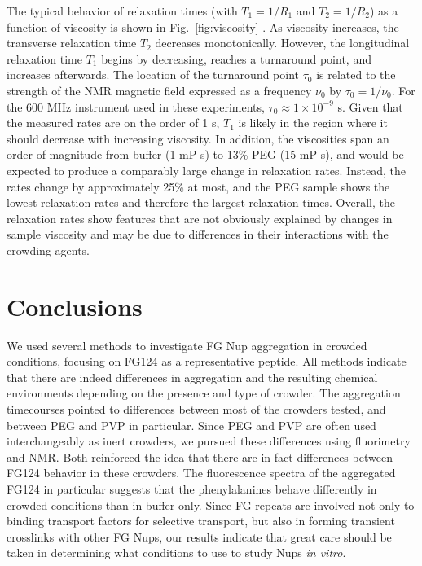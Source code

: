 The typical behavior of relaxation times (with $T_1 = 1/R_1$ and $T_2 = 1/R_2$) as a function of viscosity is shown in Fig.~\ref{fig:viscosity} \cite{reich18}.  As viscosity increases, the transverse relaxation time $T_2$ decreases monotonically.  However, the longitudinal relaxation time $T_1$ begins by decreasing, reaches a turnaround point, and increases afterwards.  The location of the turnaround point $\tau_0$ is related to the strength of the NMR magnetic field expressed as a frequency $\nu_0$ by $\tau_0 = 1/\nu_0$.  For the 600 MHz instrument used in these experiments, $\tau_0 \approx 1\times 10^{-9}$ s.  Given that the measured rates are on the order of 1 s, $T_1$ is likely in the region where it should decrease with increasing viscosity.  In addition, the viscosities span an order of magnitude from buffer (1 mP s) to 13\% PEG (15 mP s), and would be expected to produce a comparably large change in relaxation rates.  Instead, the rates change by approximately 25\% at most, and the PEG sample shows the lowest relaxation rates and therefore the largest relaxation times.  Overall, the relaxation rates show features that are not obviously explained by changes in sample viscosity and may be due to differences in their interactions with the crowding agents.

\section{Conclusions}

We used several methods to investigate FG Nup aggregation in crowded conditions, focusing on FG124 as a representative peptide.  All methods indicate that there are indeed differences in aggregation and the resulting chemical environments depending on the presence and type of crowder.  The aggregation timecourses pointed to differences between most of the crowders tested, and between PEG and PVP in particular.  Since PEG and PVP are often used interchangeably as inert crowders, we pursued  these differences using fluorimetry and NMR.  Both reinforced the idea that there are in fact differences between FG124 behavior in these crowders.  The fluorescence spectra of the aggregated FG124 in particular suggests that the phenylalanines behave differently in crowded conditions than in buffer only.  Since FG repeats are involved not only to binding transport factors for selective transport, but also in forming transient crosslinks with other FG Nups, our results indicate that great care should be taken in determining what conditions to use to study Nups \textit{in vitro}.
